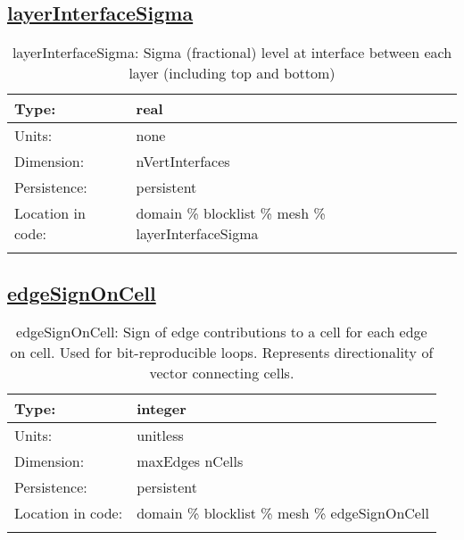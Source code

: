 \subsection[layerInterfaceSigma]{\hyperref[sec:var_tab_mesh]{layerInterfaceSigma}}
\label{subsec:var_sec_mesh_layerInterfaceSigma}
\begin{center}
\begin{longtable}{| p{2.0in} | p{4.0in} |}
        \hline 
        Type: & real \\
        \hline 
        Units: & \si{none} \\
        \hline 
        Dimension: & nVertInterfaces \\
        \hline 
        Persistence: & persistent \\
        \hline 
         Location in code: & domain \% blocklist \% mesh \% layerInterfaceSigma \\
         \hline 
    \caption{layerInterfaceSigma: Sigma (fractional) level at interface between each layer (including top and bottom)}
\end{longtable}
\end{center}
\subsection[edgeSignOnCell]{\hyperref[sec:var_tab_mesh]{edgeSignOnCell}}
\label{subsec:var_sec_mesh_edgeSignOnCell}
\begin{center}
\begin{longtable}{| p{2.0in} | p{4.0in} |}
        \hline 
        Type: & integer \\
        \hline 
        Units: & \si{unitless} \\
        \hline 
        Dimension: & maxEdges nCells \\
        \hline 
        Persistence: & persistent \\
        \hline 
         Location in code: & domain \% blocklist \% mesh \% edgeSignOnCell \\
         \hline 
    \caption{edgeSignOnCell: Sign of edge contributions to a cell for each edge on cell. Used for bit-reproducible loops. Represents directionality of vector connecting cells.}
\end{longtable}
\end{center}

